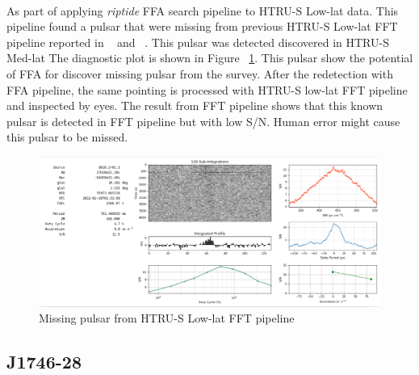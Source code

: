 \documentclass[thesis_msc.tex]{subfiles}
\begin{document}
   \paragraph{} As part of applying \textit{riptide} FFA search pipeline to HTRU-S Low-lat data. This pipeline found a pulsar that were missing from previous HTRU-S Low-lat FFT pipeline reported in ~\citep{Andrew} and ~\citep{Ng}. This pulsar was detected discovered in HTRU-S Med-lat  The diagnostic plot is shown in Figure ~\ref{missing}. This pulsar show the potential of FFA for discover missing pulsar from the survey. After the redetection with FFA pipeline, the same pointing is processed with HTRU-S low-lat FFT pipeline and inspected by eyes. The result from FFT pipeline shows that this known pulsar is detected in FFT pipeline but with low S/N. Human error might cause this pulsar to be missed.  
       \begin{figure}[h]
\centering
\includegraphics[width=1.0\textwidth]{figures/missing.png}
\caption{Missing pulsar from HTRU-S Low-lat FFT pipeline}\label{missing}
\end{figure}

    \subsection{J1746-28}
\end{document}
